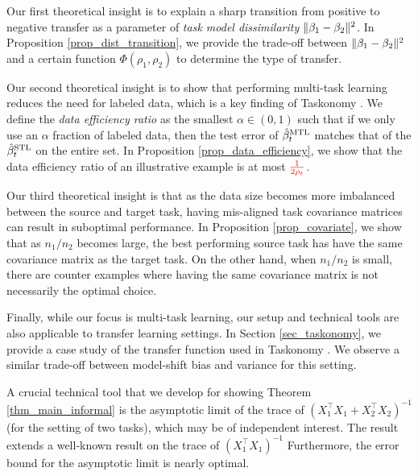 Our first theoretical insight is to explain a sharp transition from positive to negative transfer as a parameter of \textit{task model dissimilarity} $\|\beta_1 - \beta_2\|^2$.
	In Proposition \ref{prop_dist_transition}, we provide the trade-off between $\|\beta_1 - \beta_2\|^2$ and a certain function $\Phi(\rho_1, \rho_2)$ to determine the type of transfer.

Our second theoretical insight is to show that performing multi-task learning reduces the need for labeled data, which is a key finding of Taskonomy \cite{ZSSGM18}.
	We define the \textit{data efficiency ratio} as the smallest $\alpha\in(0, 1)$ such that if we only use an $\alpha$ fraction of labeled data, then the test error of $\hat{\beta}_t^{\text{MTL}}$ matches that of the $\hat{\beta}_t^{\text{STL}}$ on the entire set.
	In Proposition \ref{prop_data_efficiency}, we show that the data efficiency ratio of an illustrative example is at most $\textcolor{red}{\frac {1}{2\rho_t}}$.

Our third theoretical insight is that as the data size becomes more imbalanced between the source and target task, having mis-aligned task covariance matrices can result in suboptimal performance.
	In Proposition \ref{prop_covariate}, we show that as $n_1 / n_2$ becomes large, the best performing source task has have the same covariance matrix as the target task.
	On the other hand, when $n_1 / n_2$ is small, there are counter examples where having the same covariance matrix is not necessarily the optimal choice.


Finally, while our focus is multi-task learning, our setup and technical tools are also applicable to transfer learning settings.
In Section \ref{sec_taskonomy}, we provide a case study of the transfer function used in Taskonomy \cite{ZSSGM18}.
We observe a similar trade-off between model-shift bias and variance for this setting.

A crucial technical tool that we develop for showing Theorem \ref{thm_main_informal} is the asymptotic limit of the trace of $(X_1^{\top}X_1 + X_2^{\top}X_2)^{-1}$ (for the setting of two tasks), which may be of independent interest.
The result extends a well-known result on the trace of $(X_1^{\top}X_1)^{-1}$ \cite{S07}
Furthermore, the error bound for the asymptotic limit is nearly optimal.

